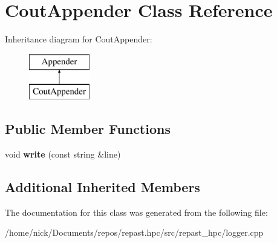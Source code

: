 \hypertarget{class_cout_appender}{\section{Cout\-Appender Class Reference}
\label{class_cout_appender}
}
Inheritance diagram for Cout\-Appender\-:\begin{figure}[H]
\begin{center}
\leavevmode
\includegraphics[height=2.000000cm]{class_cout_appender}
\end{center}
\end{figure}
\subsection*{Public Member Functions}
\begin{DoxyCompactItemize}
\item 
\hypertarget{class_cout_appender_a2297ab257bd15bd97c9805123037306b}{void {\bfseries write} (const string \&line)}\label{class_cout_appender_a2297ab257bd15bd97c9805123037306b}

\end{DoxyCompactItemize}
\subsection*{Additional Inherited Members}


The documentation for this class was generated from the following file\-:\begin{DoxyCompactItemize}
\item 
/home/nick/\-Documents/repos/repast.\-hpc/src/repast\-\_\-hpc/logger.\-cpp\end{DoxyCompactItemize}
